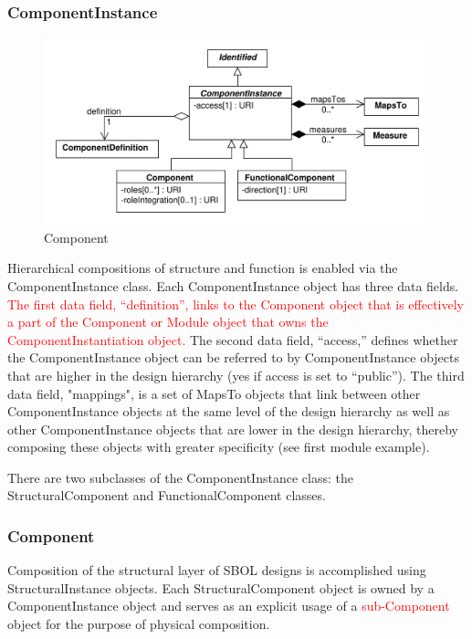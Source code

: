 \documentclass[draftspec]{sbmlpkgspec}
\begin{document}
\subsubsection{ComponentInstance}
\label{sec:ComponentInstance}

\begin{figure}[ht]
\begin{center}
\includegraphics[scale=0.6]{uml/component_instance}
\caption[]{Component}
\label{uml:component}
\end{center}
\end{figure}

Hierarchical compositions of structure and function is enabled via the ComponentInstance class. Each ComponentInstance object has three data fields. \textcolor{red}{The first data field, “definition”, links to the Component object that is effectively a part of the Component or Module object that owns the ComponentInstantiation object.} The second data field, “access,” defines whether the ComponentInstance object can be referred to by ComponentInstance objects that are higher in the design hierarchy (yes if access is set to “public”). The third data field, "mappings", is a set of MapsTo objects that link between other ComponentInstance objects at the same level of the design hierarchy as well as other ComponentInstance objects that are lower in the design hierarchy, thereby composing these objects with greater specificity (see first module example).

There are two subclasses of the ComponentInstance class: the StructuralComponent and FunctionalComponent classes.




\subsubsection{Component}
\label{sec:Component}
Composition of the structural layer of SBOL designs is accomplished using StructuralInstance objects. Each StructuralComponent object is owned by a ComponentInstance object and serves as an explicit usage of a \textcolor{red}{sub-Component} object for the purpose of physical composition.
\end{document}
